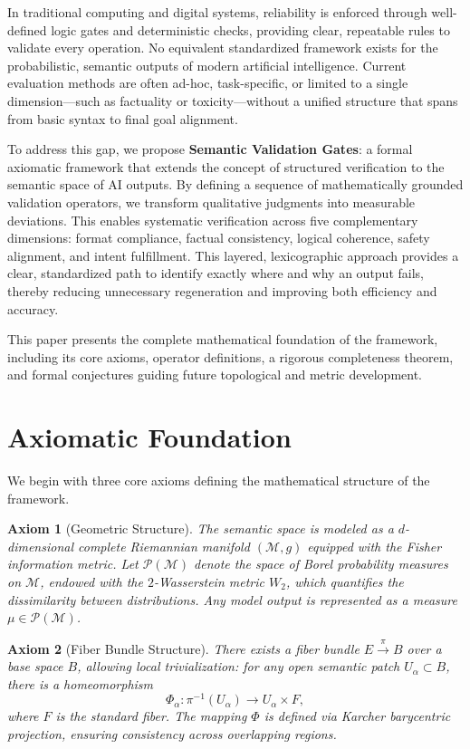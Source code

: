 \documentclass[11pt,a4paper]{article}
\theoremstyle{plain}
\newtheorem{axiom}{Axiom}[section]
\begin{document}
	In traditional computing and digital systems, reliability is enforced through well-defined logic gates and deterministic checks, providing clear, repeatable rules to validate every operation. No equivalent standardized framework exists for the probabilistic, semantic outputs of modern artificial intelligence. Current evaluation methods are often ad-hoc, task-specific, or limited to a single dimension—such as factuality or toxicity—without a unified structure that spans from basic syntax to final goal alignment.
	
	To address this gap, we propose \textbf{Semantic Validation Gates}: a formal axiomatic framework that extends the concept of structured verification to the semantic space of AI outputs. By defining a sequence of mathematically grounded validation operators, we transform qualitative judgments into measurable deviations. This enables systematic verification across five complementary dimensions: format compliance, factual consistency, logical coherence, safety alignment, and intent fulfillment. This layered, lexicographic approach provides a clear, standardized path to identify exactly where and why an output fails, thereby reducing unnecessary regeneration and improving both efficiency and accuracy.
	
	This paper presents the complete mathematical foundation of the framework, including its core axioms, operator definitions, a rigorous completeness theorem, and formal conjectures guiding future topological and metric development.
	
	\section{Axiomatic Foundation}
	
	We begin with three core axioms defining the mathematical structure of the framework.
	
	\begin{axiom}[Geometric Structure]
		The semantic space is modeled as a $d$-dimensional complete Riemannian manifold $(\mathcal{M}, g)$ equipped with the Fisher information metric. Let $\mathcal{P}(\mathcal{M})$ denote the space of Borel probability measures on $\mathcal{M}$, endowed with the $2$-Wasserstein metric $W_2$, which quantifies the dissimilarity between distributions. Any model output is represented as a measure $\mu \in \mathcal{P}(\mathcal{M})$.
	\end{axiom}
	
	\begin{axiom}[Fiber Bundle Structure]
		There exists a fiber bundle $E \xrightarrow{\pi} B$ over a base space $B$, allowing local trivialization: for any open semantic patch $U_\alpha \subset B$, there is a homeomorphism
		\[
		\Phi_\alpha: \pi^{-1}(U_\alpha) \to U_\alpha \times F,
		\]
		where $F$ is the standard fiber. The mapping $\Phi$ is defined via Karcher barycentric projection, ensuring consistency across overlapping regions.
	\end{axiom}
	
\end{document}
